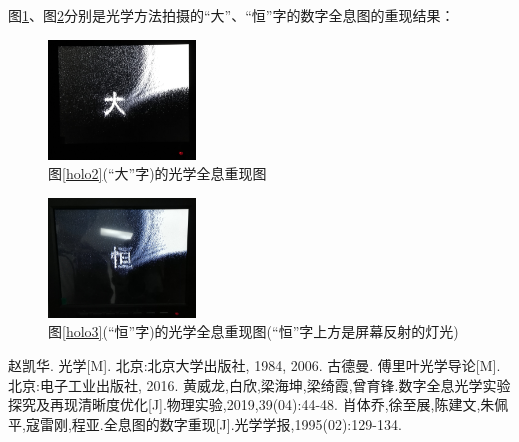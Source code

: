 \documentclass[10pt,a4paper,twocolumn,twoside,UTF8]{ctexart}
\begin{document}
		图\ref{holorel22}、图\ref{holorel33}分别是光学方法拍摄的“大”、“恒”字的数字全息图的重现结果：
		\begin{figure}[H]
			\centering
			\includegraphics[width=0.35\textwidth]{img//2.5.3.2.jpg}
			\caption{图\ref{holo2}(“大”字)的光学全息重现图}
			\label{holorel22}
		\end{figure}
		\begin{figure}[H]
			\centering
			\includegraphics[width=0.35\textwidth]{img//2.4.7.3.jpg}
			\caption{图\ref{holo3}(“恒”字)的光学全息重现图\quad (“恒”字上方是屏幕反射的灯光)}
			\label{holorel33}
		\end{figure}


	\begin{thebibliography}{9}
		 赵凯华. 光学[M]. 北京:北京大学出版社, 1984, 2006.
		 古德曼. 傅里叶光学导论[M]. 北京:电子工业出版社, 2016.
		 黄威龙,白欣,梁海坤,梁绮霞,曾育锋.数字全息光学实验探究及再现清晰度优化[J].物理实验,2019,39(04):44-48.
		 肖体乔,徐至展,陈建文,朱佩平,寇雷刚,程亚.全息图的数字重现[J].光学学报,1995(02):129-134.

	\end{thebibliography}
	
\end{document}

